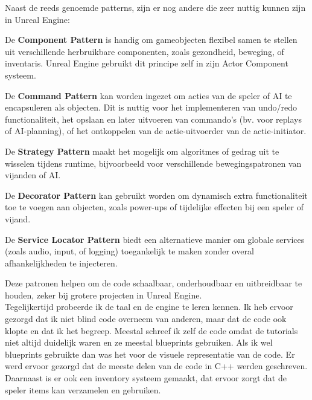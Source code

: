 Naast de reeds genoemde patterns, zijn er nog andere die zeer nuttig kunnen zijn in Unreal Engine:

De \textbf{Component Pattern} is handig om gameobjecten flexibel samen te stellen uit verschillende herbruikbare componenten, zoals gezondheid, beweging, of inventaris. Unreal Engine gebruikt dit principe zelf in zijn Actor Component systeem.

De \textbf{Command Pattern} kan worden ingezet om acties van de speler of AI te encapsuleren als objecten. Dit is nuttig voor het implementeren van undo/redo functionaliteit, het opslaan en later uitvoeren van commando's (bv. voor replays of AI-planning), of het ontkoppelen van de actie-uitvoerder van de actie-initiator.

De \textbf{Strategy Pattern} maakt het mogelijk om algoritmes of gedrag uit te wisselen tijdens runtime, bijvoorbeeld voor verschillende bewegingspatronen van vijanden of AI.

De \textbf{Decorator Pattern} kan gebruikt worden om dynamisch extra functionaliteit toe te voegen aan objecten, zoals power-ups of tijdelijke effecten bij een speler of vijand.

De \textbf{Service Locator Pattern} biedt een alternatieve manier om globale services (zoals audio, input, of logging) toegankelijk te maken zonder overal afhankelijkheden te injecteren.

Deze patronen helpen om de code schaalbaar, onderhoudbaar en uitbreidbaar te houden, zeker bij grotere projecten in Unreal Engine.
\\

Tegelijkertijd probeerde ik de taal en de engine te leren kennen.
Ik heb ervoor gezorgd dat ik niet blind code overneem van anderen, maar dat de code ook klopte en dat ik het begreep.
Meestal schreef ik zelf de code omdat de tutorials niet altijd duidelijk waren en ze meestal blueprints gebruiken.
Als ik wel blueprints gebruikte dan was het voor de visuele representatie van de code.
Er werd ervoor gezorgd dat de meeste delen van de code in C++ werden geschreven.
\\

Daarnaast is er ook een inventory systeem gemaakt, dat ervoor zorgt dat de speler items kan verzamelen en gebruiken.






